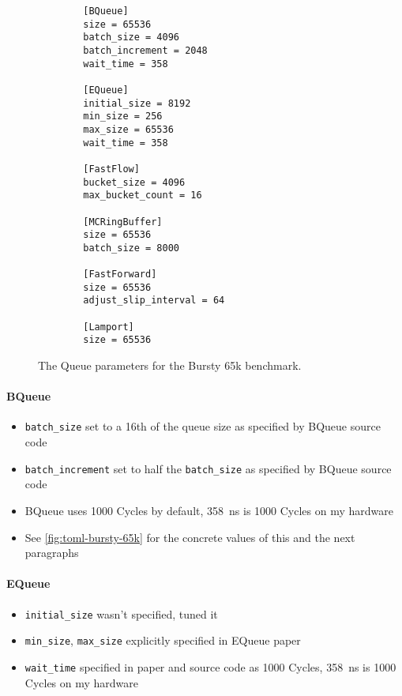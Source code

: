 \begin{figure}
    \centering
    \begin{verbatim}
        [BQueue]
        size = 65536
        batch_size = 4096
        batch_increment = 2048
        wait_time = 358

        [EQueue]
        initial_size = 8192
        min_size = 256
        max_size = 65536
        wait_time = 358

        [FastFlow]
        bucket_size = 4096
        max_bucket_count = 16

        [MCRingBuffer]
        size = 65536
        batch_size = 8000

        [FastForward]
        size = 65536
        adjust_slip_interval = 64

        [Lamport]
        size = 65536
    \end{verbatim}
    \caption{The Queue parameters for the Bursty 65k benchmark.}
    \label{fig:toml-bursty-65k}
\end{figure}

\paragraph{BQueue}
\begin{itemize}
    \item \texttt{batch\_size} set to a 16th of the queue size as specified by BQueue source code
    \item \texttt{batch\_increment} set to half the \texttt{batch\_size} as specified by BQueue source code
    \item BQueue uses 1000 Cycles by default, \SI{358}{\nano\second} is 1000 Cycles on my hardware
    \item See \autoref{fig:toml-bursty-65k} for the concrete values of this and the next paragraphs
\end{itemize}

\paragraph{EQueue}
\begin{itemize}
    \item \texttt{initial\_size} wasn't specified, tuned it
    \item \texttt{min\_size}, \texttt{max\_size} explicitly specified in EQueue paper
    \item \texttt{wait\_time} specified in paper and source code as 1000 Cycles, \SI{358}{\nano\second} is
        1000 Cycles on my hardware
\end{itemize}

